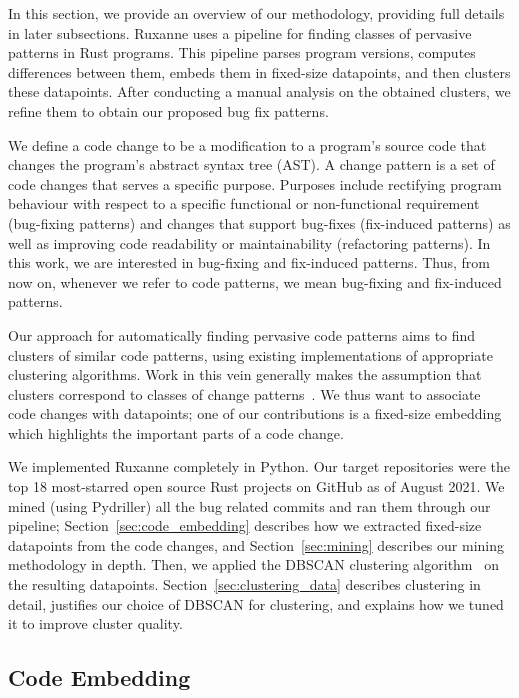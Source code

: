 In this section, we provide an overview of our methodology, providing full details in later subsections. Ruxanne uses a pipeline for finding classes of pervasive patterns in Rust programs. This pipeline parses program versions, computes differences between them, embeds them in fixed-size datapoints, and then clusters these datapoints. After conducting a manual analysis on the obtained clusters, we refine them to obtain our proposed bug fix patterns.

We define a code change to be a modification to a program's source code that changes the program's abstract syntax tree (AST). A change pattern is a set of code changes that serves a specific purpose. Purposes include rectifying program behaviour with respect to a specific functional or non-functional requirement (bug-fixing patterns) and changes that support bug-fixes (fix-induced patterns) as well as improving code readability or maintainability (refactoring patterns). In this work, we are interested in bug-fixing and fix-induced patterns. Thus, from now on, whenever we refer to code patterns, we mean bug-fixing and fix-induced patterns.

Our approach for automatically finding pervasive code patterns aims to find clusters of similar code patterns, using existing implementations of appropriate clustering algorithms. Work in this vein generally makes the assumption that clusters correspond to classes of change patterns~\citep{hanam2016discovering,campos2019discovering,yang2022mining}. We thus want to associate code changes with datapoints; one of our contributions is a fixed-size embedding which highlights the important parts of a code change.


We implemented Ruxanne completely in Python. Our target repositories were the top 18 most-starred open source Rust projects on GitHub as of August 2021. We mined (using Pydriller) all the bug related commits and ran them through our pipeline; Section~\ref{sec:code_embedding} describes how we extracted fixed-size datapoints from the code changes, and Section~\ref{sec:mining} describes our mining methodology in depth. Then, we applied the DBSCAN clustering algorithm~\citep{ester1996density} on the resulting datapoints. Section~\ref{sec:clustering_data} describes clustering in detail, justifies our choice of DBSCAN for clustering, and explains how we tuned it to improve cluster quality. 

\subsection{\label{sec:code_embedding}Code Embedding}

